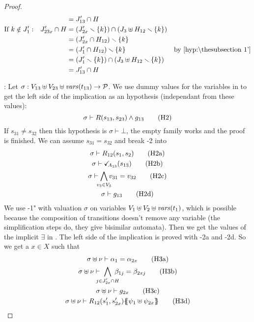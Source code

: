 \documentclass{article}
\begin{document}
\begin{proof}
\begin{align*}
		&&& = J'_{13} \cap H \\
		\text{If } k \notin J'_1: && J'_{23x} \cap H & = \mpar{J'_{2x} \setminus \mbrc{k}} \cap \mpar{J_3 \uplus H_{12} \setminus \mbrc{k}} \\
		&&& = \mpar{J'_{2x} \cap H_{12}} \setminus \mbrc{k} \\
		&&& = \mpar{J'_1 \cap H_{12}} \setminus \mbrc{k} & \text{by \hyp{1'}} \\
		&&& = \mpar{J'_1 \setminus \mbrc{k}} \cap \mpar{J_3 \uplus H_{12} \setminus \mbrc{k}} \\
		&&& = J'_{13} \cap H
	\end{align*}
\item[\goal{2}:] Let \(\sigma: V_{13} \uplus V_{23} \uplus \mathit{vars}{\left(t_{13}\right)} \to \mathcal{P}\).
	We use dummy values for the variables in  to get the left side of the implication as an hypothesis (independant from these values):
	\[ \sigma \vdash R\mpar{s_{13}, s_{23}} \wedge g_{13} \hyp{2} \]
	If \(s_{31} \neq s_{32}\) then this hypothesis is \(\sigma \vdash \bot\), the empty family works and the proof is finished.
	We can assume \(s_{31} = s_{32}\) and break \hyp{2} into
	\begin{gather}
		\sigma \vdash R_{12}\mpar{s_1, s_2} \hyp{2a} \\
		\sigma \vdash \reach{A_{13}}\mpar{s_{13}} \hyp{2b} \\
		\sigma \vdash \bigwedge_\subbox{v_3 \in V_3} v_{31} = v_{32} \hyp{2c} \\
		\sigma \vdash g_{13} \hyp{2d}
	\end{gather}
	We use \hyp{1"} with valuation \(\sigma\) on variables \(V_1 \uplus V_2 \uplus \mathit{vars}{\left(t_1\right)}\), which is possible because the composition of transitions doesn't remove any variable (the simplification steps do, they give bisimilar automata).
	Then we get the values of the implicit \(\exists\) in .
	The left side of the implication is proved with \hyp{2a} and \hyp{2d}.
	So we get a \(x \in X\) such that
	\begin{gather}
		\sigma \uplus \nu \vdash \alpha_1 = \alpha_{2x} \hyp{3a} \\
		\sigma \uplus \nu \vdash \bigwedge_\subbox{j \in J'_{2x} \cap H} \beta_{1j} = \beta_{2xj} \hyp{3b} \\
		\sigma \uplus \nu \vdash g_{2x} \hyp{3c} \\
		\sigma \uplus \nu \vdash R_{12}\mpar{s'_1, s'_{2x}}\psubst{\psi_1 \uplus \psi_{2x}} \hyp{3d}
	\end{gather}

\end{proof}
\end{document}
